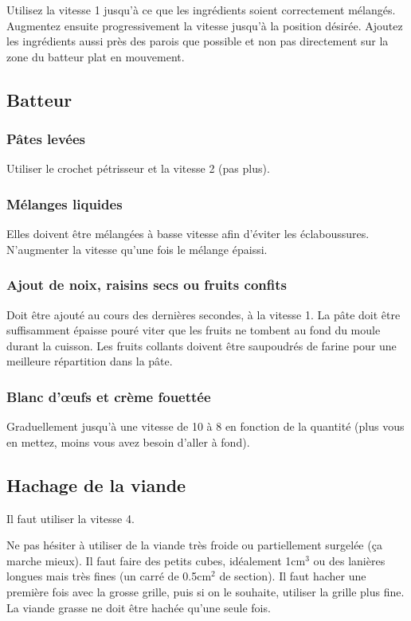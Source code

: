 \documentclass[a4paper,twoside,openright]{report}
\begin{document}
Utilisez la vitesse 1 jusqu'à ce que les ingrédients soient correctement mélangés. Augmentez ensuite progressivement la vitesse 
jusqu'à la position désirée. Ajoutez les ingrédients aussi près des parois que possible et non pas directement sur la zone du 
batteur plat en mouvement. 

\subsection{Batteur}
\subsubsection{Pâtes levées}
Utiliser le crochet pétrisseur et la vitesse 2 (pas plus). 

\subsubsection{Mélanges liquides}
Elles doivent être mélangées à basse vitesse afin d'éviter les éclaboussures. N'augmenter la vitesse qu'une fois le mélange 
épaissi. 

\subsubsection{Ajout de noix, raisins secs ou fruits confits}
Doit être ajouté au cours des dernières secondes, à la vitesse 1. La pâte doit être suffisamment épaisse pouré viter que les 
fruits ne tombent au fond du moule durant la cuisson. Les fruits collants doivent être saupoudrés de farine pour une meilleure 
répartition dans la pâte.

\subsubsection{Blanc d'œufs et crème fouettée}
Graduellement jusqu'à une vitesse de 10 à 8 en fonction de la quantité (plus vous en mettez, moins vous avez besoin d'aller à 
fond).

\subsection{Hachage de la viande}
Il faut utiliser la vitesse 4. 

Ne pas hésiter à utiliser de la viande très froide ou partiellement surgelée (ça marche mieux). Il faut faire des petits cubes, 
idéalement 1cm$^3$ ou des lanières longues mais très fines (un carré de 0.5cm$^2$ de section).
Il faut hacher une première fois avec la grosse grille, puis si on le souhaite, utiliser la grille plus fine. La viande grasse 
ne doit être hachée qu'une seule fois.
\end{document}
